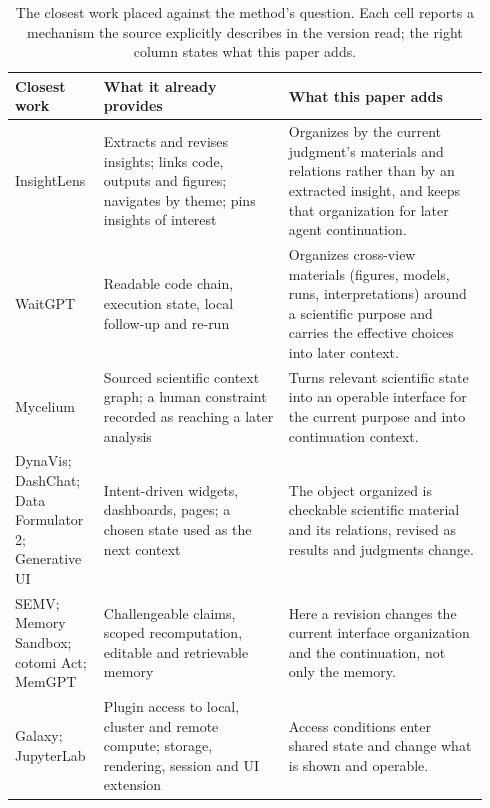 \documentclass[11pt]{article}
\begin{document}
\begin{table}[H]
\centering
\footnotesize
\caption{The closest work placed against the method's question. Each cell reports a mechanism the source explicitly describes in the version read; the right column states what this paper adds.}
\label{tab:closest}
\begin{tabular}{@{}>{\raggedright\arraybackslash}p{0.17\linewidth} >{\raggedright\arraybackslash}p{0.37\linewidth} >{\raggedright\arraybackslash}p{0.40\linewidth}@{}}
\hline
Closest work & What it already provides & What this paper adds \\
\hline
InsightLens & Extracts and revises insights; links code, outputs and figures; navigates by theme; pins insights of interest \cite{insightlens} & Organizes by the current judgment's materials and relations rather than by an extracted insight, and keeps that organization for later agent continuation. \\
\hline
WaitGPT & Readable code chain, execution state, local follow-up and re-run \cite{waitgpt} & Organizes cross-view materials (figures, models, runs, interpretations) around a scientific purpose and carries the effective choices into later context. \\
\hline
Mycelium & Sourced scientific context graph; a human constraint recorded as reaching a later analysis \cite{mycelium} & Turns relevant scientific state into an operable interface for the current purpose and into continuation context. \\
\hline
DynaVis; DashChat; Data Formulator 2; Generative UI & Intent-driven widgets, dashboards, pages; a chosen state used as the next context \cite{dynavis,dashchat,dataformulator,generativeui} & The object organized is checkable scientific material and its relations, revised as results and judgments change. \\
\hline
SEMV; Memory Sandbox; cotomi Act; MemGPT & Challengeable claims, scoped recomputation, editable and retrievable memory \cite{semv,memorysandbox,cotomi,memgpt} & Here a revision changes the current interface organization and the continuation, not only the memory. \\
\hline
Galaxy; JupyterLab & Plugin access to local, cluster and remote compute; storage, rendering, session and UI extension \cite{galaxy,jupyterlab} & Access conditions enter shared state and change what is shown and operable. \\
\hline
\end{tabular}
\end{table}
\end{document}

